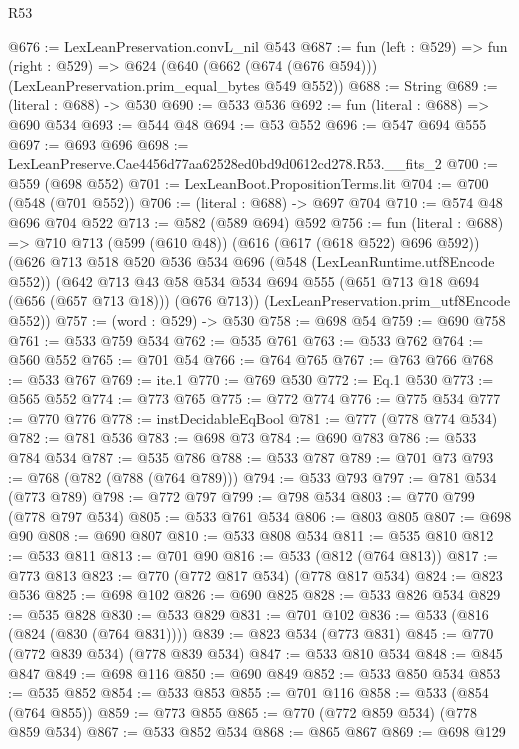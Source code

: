 \begin{lexlean}{R53}
\begin{coremodule}
@676 := LexLeanPreservation.convL_nil @543
@687 := fun (left : @529) =>
  fun (right : @529) =>
  @624 (@640 (@662 (@674 (@676 @594))) (LexLeanPreservation.prim_equal_bytes @549 @552))
@688 := String
@689 := (literal : @688) -> @530
@690 := @533 @536
@692 := fun (literal : @688) => @690 @534
@693 := @544 @48
@694 := @53 @552
@696 := @547 @694 @555
@697 := @693 @696
@698 := LexLeanPreserve.Cae4456d77aa62528ed0bd9d0612cd278.R53.__fits_2
@700 := @559 (@698 @552)
@701 := LexLeanBoot.PropositionTerms.lit
@704 := @700 (@548 (@701 @552))
@706 := (literal : @688) -> @697 @704
@710 := @574 @48 @696 @704 @522
@713 := @582 (@589 @694) @592
@756 := fun (literal : @688) =>
  @710
    @713
    (@599 (@610 @48))
    (@616 (@617 (@618 @522) @696 @592))
    (@626
      @713
      @518
      @520
      @536
      @534
      @696
      (@548 (LexLeanRuntime.utf8Encode @552))
      (@642
        @713
        @43
        @58
        @534
        @534
        @694
        @555
        (@651 @713 @18 @694 (@656 (@657 @713 @18)))
        (@676 @713))
      (LexLeanPreservation.prim_utf8Encode @552))
@757 := (word : @529) -> @530
@758 := @698 @54
@759 := @690 @758
@761 := @533 @759 @534
@762 := @535 @761
@763 := @533 @762
@764 := @560 @552
@765 := @701 @54
@766 := @764 @765
@767 := @763 @766
@768 := @533 @767
@769 := ite.{1}
@770 := @769 @530
@772 := Eq.{1} @530
@773 := @565 @552
@774 := @773 @765
@775 := @772 @774
@776 := @775 @534
@777 := @770 @776
@778 := instDecidableEqBool
@781 := @777 (@778 @774 @534)
@782 := @781 @536
@783 := @698 @73
@784 := @690 @783
@786 := @533 @784 @534
@787 := @535 @786
@788 := @533 @787
@789 := @701 @73
@793 := @768 (@782 (@788 (@764 @789)))
@794 := @533 @793
@797 := @781 @534 (@773 @789)
@798 := @772 @797
@799 := @798 @534
@803 := @770 @799 (@778 @797 @534)
@805 := @533 @761 @534
@806 := @803 @805
@807 := @698 @90
@808 := @690 @807
@810 := @533 @808 @534
@811 := @535 @810
@812 := @533 @811
@813 := @701 @90
@816 := @533 (@812 (@764 @813))
@817 := @773 @813
@823 := @770 (@772 @817 @534) (@778 @817 @534)
@824 := @823 @536
@825 := @698 @102
@826 := @690 @825
@828 := @533 @826 @534
@829 := @535 @828
@830 := @533 @829
@831 := @701 @102
@836 := @533 (@816 (@824 (@830 (@764 @831))))
@839 := @823 @534 (@773 @831)
@845 := @770 (@772 @839 @534) (@778 @839 @534)
@847 := @533 @810 @534
@848 := @845 @847
@849 := @698 @116
@850 := @690 @849
@852 := @533 @850 @534
@853 := @535 @852
@854 := @533 @853
@855 := @701 @116
@858 := @533 (@854 (@764 @855))
@859 := @773 @855
@865 := @770 (@772 @859 @534) (@778 @859 @534)
@867 := @533 @852 @534
@868 := @865 @867
@869 := @698 @129

\end{coremodule}
\end{lexlean}
